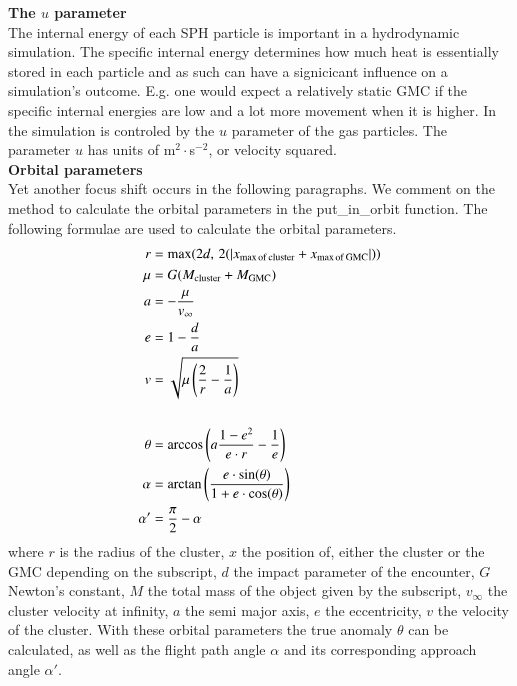 \documentclass{aa}
\begin{document}
\noindent \textbf{The $u$ parameter} \\
The internal energy of each SPH particle is important in a hydrodynamic simulation. The specific internal energy determines how much heat is essentially stored in each particle and as such can have a signicicant influence on a simulation's outcome. E.g. one would expect a relatively static GMC if the specific internal energies are low and a lot more movement when it is higher. In the simulation is controled by the $u$ parameter of the gas particles. The parameter $u$ has units of m$^2\cdot$s$^{-2}$, or velocity squared. \\

\noindent \textbf{Orbital parameters} \\
Yet another focus shift occurs in the following paragraphs. We comment on the method to calculate the orbital parameters in the put\_in\_orbit function. The following formulae are used to calculate the orbital parameters.
\begin{align}
    r &= \text{max}(2d, \, 2 (\left| x_{\rm max \, of \, cluster} + x_{\rm max \, of \, GMC}\right|)) \\
    \mu &= G (M_{\rm cluster} + M_{\rm GMC}) \\
    a &= -\frac{\mu}{v_\infty} \label{eq:a} \\
    e &= 1 - \frac{d}{a} \label{eq:e} \\
    v &= \sqrt{\mu \left(\frac{2}{r} - \frac{1}{a}\right)} \\
    \newline \nonumber \\
    \theta &= \arccos \left(a \frac{1-e^2}{e\cdot r} - \frac{1}{e} \right) \\
    \alpha &=  \arctan \left(\frac{e\cdot \sin(\theta)}{1 + e\cdot \cos(\theta)}\right) \\
    \alpha' &= \frac{\pi}{2} - \alpha
\end{align}
where $r$ is the radius of the cluster, $x$ the position of, either the cluster or the GMC depending on the subscript, $d$ the impact parameter of the encounter, $G$ Newton's constant, $M$ the total mass of the object given by the subscript, $v_\infty$ the cluster velocity at infinity, $a$ the semi major axis, $e$ the eccentricity, $v$ the velocity of the cluster. With these orbital parameters the true anomaly $\theta$ can be calculated, as well as the flight path angle $\alpha$ and its corresponding approach angle $\alpha'$.
\end{document}
